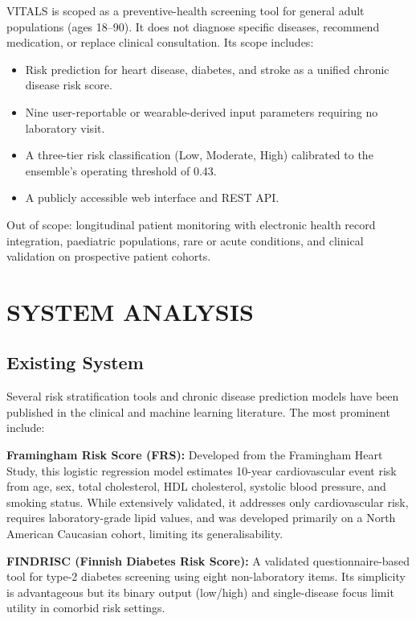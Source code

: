 \documentclass[12pt,a4paper]{report}
\begin{document}
VITALS is scoped as a preventive-health screening tool for general adult populations (ages 18--90). It does not diagnose specific diseases, recommend medication, or replace clinical consultation. Its scope includes:

\begin{itemize}[leftmargin=*]
  \item Risk prediction for heart disease, diabetes, and stroke as a unified chronic disease risk score.
  \item Nine user-reportable or wearable-derived input parameters requiring no laboratory visit.
  \item A three-tier risk classification (Low, Moderate, High) calibrated to the ensemble's operating threshold of 0.43.
  \item A publicly accessible web interface and REST API.
\end{itemize}

Out of scope: longitudinal patient monitoring with electronic health record integration, paediatric populations, rare or acute conditions, and clinical validation on prospective patient cohorts.

\chapter{SYSTEM ANALYSIS}

\section{Existing System}

Several risk stratification tools and chronic disease prediction models have been published in the clinical and machine learning literature. The most prominent include:

\textbf{Framingham Risk Score (FRS):} Developed from the Framingham Heart Study, this logistic regression model estimates 10-year cardiovascular event risk from age, sex, total cholesterol, HDL cholesterol, systolic blood pressure, and smoking status. While extensively validated, it addresses only cardiovascular risk, requires laboratory-grade lipid values, and was developed primarily on a North American Caucasian cohort, limiting its generalisability.

\textbf{FINDRISC (Finnish Diabetes Risk Score):} A validated questionnaire-based tool for type-2 diabetes screening using eight non-laboratory items. Its simplicity is advantageous but its binary output (low/high) and single-disease focus limit utility in comorbid risk settings.
\end{document}
